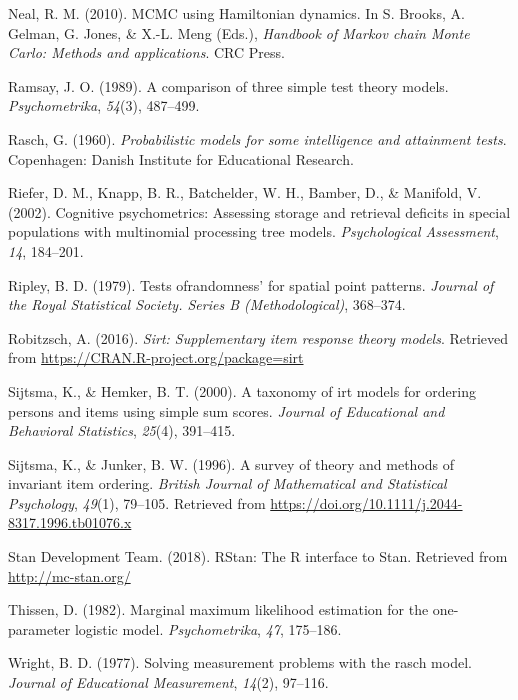 \documentclass[english,,man]{apa6}
\begin{document}
\leavevmode\hypertarget{ref-Neal:2010}{}%
Neal, R. M. (2010). MCMC using Hamiltonian dynamics. In S. Brooks, A. Gelman, G. Jones, \& X.-L. Meng (Eds.), \emph{Handbook of Markov chain Monte Carlo: Methods and applications}. CRC Press.

\leavevmode\hypertarget{ref-Ramsay:1989}{}%
Ramsay, J. O. (1989). A comparison of three simple test theory models. \emph{Psychometrika}, \emph{54}(3), 487--499.

\leavevmode\hypertarget{ref-Rasch:1960}{}%
Rasch, G. (1960). \emph{Probabilistic models for some intelligence and attainment tests}. Copenhagen: Danish Institute for Educational Research.

\leavevmode\hypertarget{ref-Riefer:etal:2002}{}%
Riefer, D. M., Knapp, B. R., Batchelder, W. H., Bamber, D., \& Manifold, V. (2002). Cognitive psychometrics: Assessing storage and retrieval deficits in special populations with multinomial processing tree models. \emph{Psychological Assessment}, \emph{14}, 184--201.

\leavevmode\hypertarget{ref-Ripley:1979}{}%
Ripley, B. D. (1979). Tests ofrandomness' for spatial point patterns. \emph{Journal of the Royal Statistical Society. Series B (Methodological)}, 368--374.

\leavevmode\hypertarget{ref-Robitzsch:2016}{}%
Robitzsch, A. (2016). \emph{Sirt: Supplementary item response theory models}. Retrieved from \url{https://CRAN.R-project.org/package=sirt}

\leavevmode\hypertarget{ref-Sijtsma:Hemker:2000}{}%
Sijtsma, K., \& Hemker, B. T. (2000). A taxonomy of irt models for ordering persons and items using simple sum scores. \emph{Journal of Educational and Behavioral Statistics}, \emph{25}(4), 391--415.

\leavevmode\hypertarget{ref-Sijtsma:Junker:1996}{}%
Sijtsma, K., \& Junker, B. W. (1996). A survey of theory and methods of invariant item ordering. \emph{British Journal of Mathematical and Statistical Psychology}, \emph{49}(1), 79--105. Retrieved from \url{https://doi.org/10.1111/j.2044-8317.1996.tb01076.x}

\leavevmode\hypertarget{ref-rstan:2018}{}%
Stan Development Team. (2018). RStan: The R interface to Stan. Retrieved from \url{http://mc-stan.org/}

\leavevmode\hypertarget{ref-Thissen:1982}{}%
Thissen, D. (1982). Marginal maximum likelihood estimation for the one-parameter logistic model. \emph{Psychometrika}, \emph{47}, 175--186.

\leavevmode\hypertarget{ref-Wright:1977}{}%
Wright, B. D. (1977). Solving measurement problems with the rasch model. \emph{Journal of Educational Measurement}, \emph{14}(2), 97--116.
\end{document}
